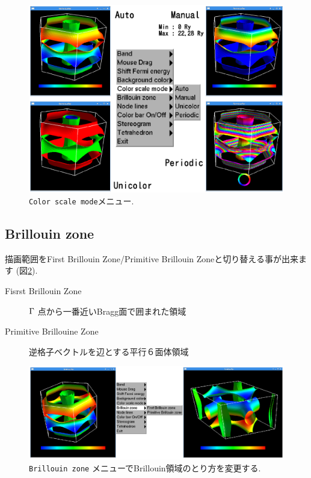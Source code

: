 \documentclass[12pt]{jarticle}
\begin{document}
\begin{figure}[!ht]
  \includegraphics[width=17cm]{figs/colorscale.eps}
  \caption{\texttt{Color scale mode}メニュー.}
  \label{fig_colorscale}
\end{figure}

\subsection{Brillouin zone}

描画範囲をFirst Brillouin Zone/Primitive Brillouin Zoneと切り替える事が出来ます
(図\ref{fig_brillouinzone}).
\begin{description}
\item[Fisrst Brillouin Zone] ${\rm \Gamma}$ 点から一番近いBragg面で囲まれた領域
\item[Primitive Brillouine Zone] 逆格子ベクトルを辺とする平行６面体領域
\end{description}

\begin{figure}[!ht]
  \includegraphics[width=17cm]{figs/brillouinzone.eps}
  \caption{\texttt{Brillouin zone} メニューでBrillouin領域のとり方を変更する.}
  \label{fig_brillouinzone}
\end{figure}
\end{document}
